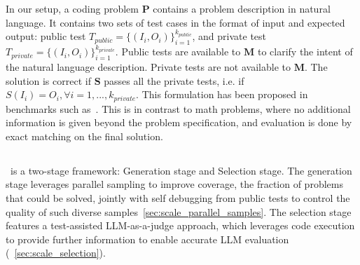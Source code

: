 In our setup, a coding problem $\mathbf{P}$ contains a problem description in natural language. It contains two sets of test cases in the format of input and expected output: public test $T_{public} = \{(I_i, O_i)\}_{i=1}^{k_{public}}$, and private test $T_{private} = \{(I_i, O_i)\}_{i=1}^{k_{private}}$. Public tests are available to $\mathbf{M}$ to clarify the intent of the natural language description. Private tests are not available to $\mathbf{M}$. The solution is correct if $\mathbf{S}$ passes all the private tests, i.e. if $S(I_i) = O_i, \forall i = 1, ..., k_{private}$. This formulation has been proposed in benchmarks such as~\citet{chen2021evaluating, li2022competition, li2023taco, jain2024livecodebench, hendrycksapps2021, gulwani4foundations}. This is in contrast to math problems, where no additional information is given beyond the problem specification, and evaluation is done by exact matching on the final solution.





\subsection{\frameworkname}
\frameworkname~is a two-stage framework: Generation stage and Selection stage.
The generation stage leverages parallel sampling to improve coverage, the fraction of problems that could be solved, jointly with self debugging from public tests to control the quality of such diverse samples~\autoref{sec:scale_parallel_samples}. The selection stage features a test-assisted LLM-as-a-judge approach, which leverages code execution to provide further information to enable accurate LLM evaluation (~\autoref{sec:scale_selection}).


